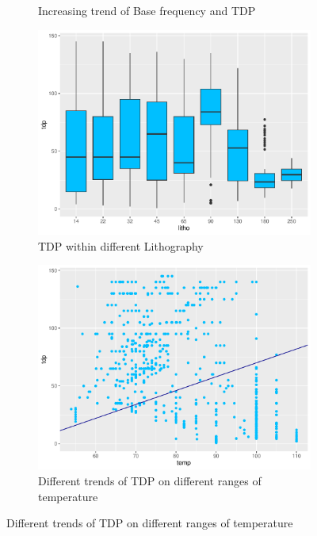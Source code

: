 \begin{figure}[H]
\begin{subfigure}[b]{0.45\textwidth}
        \caption{Increasing trend of Base frequency and TDP}
        \label{fig:tdp_analysis_bfreq}
    \end{subfigure}
    \hfill
    \begin{subfigure}[b]{0.45\textwidth}
        \centering
        \includegraphics[width=\textwidth]{./graphics/box_tdp_litho.pdf}
        \caption{TDP within different Lithography}
        \label{fig:tdp_analysis_litho}
    \end{subfigure}
    \hfill
    \begin{subfigure}[b]{0.45\textwidth}
        \centering
        \includegraphics[width=\textwidth]{./graphics/scatter_tdp_temp.pdf}
        \caption{Different trends of TDP on different ranges of temperature}

\end{subfigure}
\end{figure}
